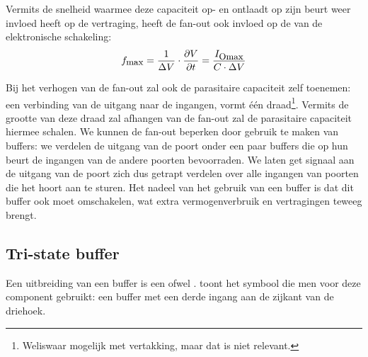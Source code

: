 Vermits de snelheid waarmee deze capaciteit op- en ontlaadt op zijn beurt weer invloed heeft op de vertraging, heeft de fan-out ook invloed op de  van de elektronische schakeling:
\begin{equation}
f_{\mbox{\small{max}}}=\displaystyle\frac{1}{\Delta V}\cdot\displaystyle\frac{\partial V}{\partial t}=\displaystyle\frac{I_{\mbox{\small{Omax}}}}{C\cdot \Delta V}
\end{equation}

Bij het verhogen van de fan-out zal ook de parasitaire capaciteit zelf toenemen: een verbinding van de uitgang naar de ingangen, vormt \'e\'en draad\footnote{Weliswaar mogelijk met vertakking, maar dat is niet relevant.}. Vermits de grootte van deze draad zal afhangen van de fan-out zal de parasitaire capaciteit hiermee schalen. We kunnen de fan-out beperken door gebruik te maken van buffers: we verdelen de uitgang van de poort onder een paar buffers die op hun beurt de ingangen van de andere poorten bevoorraden. We laten get signaal aan de uitgang van de poort zich dus getrapt verdelen over alle ingangen van poorten die het hoort aan te sturen. Het nadeel van het gebruik van een buffer is dat dit buffer ook moet omschakelen, wat extra vermogenverbruik en vertragingen teweeg brengt.

\subsection{Tri-state buffer}
Een uitbreiding van een buffer is een  ofwel .  toont het symbool die men voor deze component gebruikt: een buffer met een derde ingang aan de zijkant van de driehoek.

